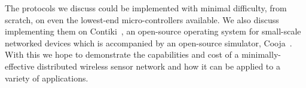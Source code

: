 The protocols we discuss could be implemented with minimal difficulty, from scratch, on even the lowest-end micro-controllers
available.  We also discuss implementing them on Contiki~\cite{contiki},
an open-source operating system for small-scale networked devices which is accompanied by an open-source simulator,
Cooja~\cite{cooja}.  With this we hope to demonstrate the capabilities and cost of a minimally-effective distributed
wireless sensor network and how it can be applied to a variety of applications.


